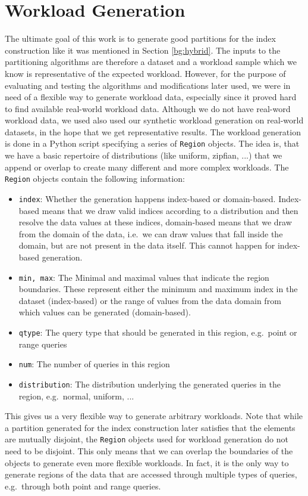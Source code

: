 \section{Workload Generation} \label{sec:wklgeneration}
The ultimate goal of this work is to generate good partitions for the index construction like it was mentioned in Section \ref{bg:hybrid}. The inputs to the partitioning algorithms are therefore a dataset and a workload sample which we know is representative of the expected workload. However, for the purpose of evaluating and testing the algorithms and modifications later used, we were in need of a flexible way to generate workload data, especially since it proved hard to find available real-world workload data. Although we do not have real-word workload data, we used also used our synthetic workload generation on real-world datasets, in the hope that we get representative results. The workload generation is done in a Python script specifying a series of \verb|Region| objects. The idea is, that we have a basic repertoire of distributions (like uniform, zipfian, ...) that we append or overlap to create many different and more complex workloads. The \verb|Region| objects contain the following information:

\begin{itemize}
    \item \verb|index|: Whether the generation happens index-based or domain-based. Index-based means that we draw valid indices according to a distribution and then resolve the data values at these indices, domain-based means that we draw from the domain of the data, i.e.~we can draw values that fall inside the domain, but are not present in the data itself. This cannot happen for index-based generation.
    \item \verb|min, max|: The Minimal and maximal values that indicate the region boundaries. These represent either the minimum and maximum index in the dataset (index-based) or the range of values from the data domain from which values can be generated (domain-based).
    \item \verb|qtype|: The query type that should be generated in this region, e.g.~point or range queries
    \item \verb|num|: The number of queries in this region
    \item \verb|distribution|: The distribution underlying the generated queries in the region, e.g.~normal, uniform, ...
\end{itemize}

This gives us a very flexible way to generate arbitrary workloads. Note that while a partition generated for the index construction later satisfies that the elements are mutually disjoint, the \verb|Region| objects used for workload generation do not need to be disjoint. This only means that we can overlap the boundaries of the objects to generate even more flexible workloads. In fact, it is the only way to generate regions of the data that are accessed through multiple types of queries, e.g.~through both point and range queries. 

